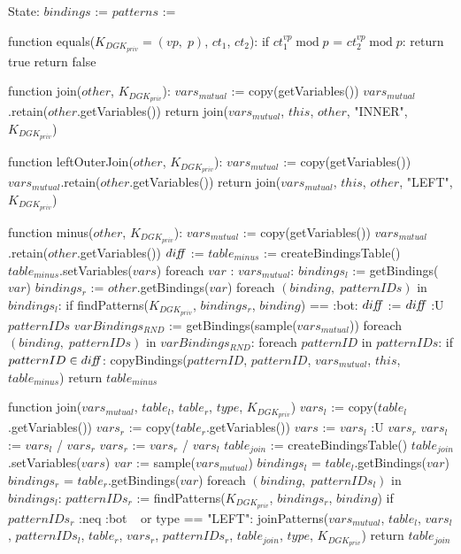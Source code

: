 State:
    $bindings$ := {}
    $patterns$ := {}

function equals($K_{DGK_{priv}} = (vp, \; p)$, $ct_1$, $ct_2$):
    if $ct_1^{vp} \; \textrm{mod} \; p$ = $ct_2^{vp} \; \textrm{mod} \; p$:
        return true
    return false

function join($other$, $K_{DGK_{priv}}$):
    $vars_{mutual}$ := copy(getVariables())
    $vars_{mutual}$.retain($other$.getVariables())
    return join($vars_{mutual}$, $this$, $other$, "INNER", $K_{DGK_{priv}}$)

function leftOuterJoin($other$, $K_{DGK_{priv}}$): 
    $vars_{mutual}$ := copy(getVariables())
    $vars_{mutual}$.retain($other$.getVariables())
    return join($vars_{mutual}$, $this$, $other$, "LEFT", $K_{DGK_{priv}}$)

function minus($other$, $K_{DGK_{priv}}$):
    $vars_{mutual}$ := copy(getVariables())
    $vars_{mutual}$.retain($other$.getVariables())
    $di\textrm{\emph{ff}}$ := {}
    $table_{minus}$ := createBindingsTable()
    $table_{minus}$.setVariables($vars$)
    foreach $var$ : $vars_{mutual}$:
        $bindings_l$ := getBindings($var$)
        $bindings_r$ := $other$.getBindings($var$)
        foreach $(binding, \; patternIDs)$ in $bindings_l$:
            if findPatterns($K_{DGK_{priv}}$, $bindings_r$, $binding$) == :bot:
                $di\textrm{\emph{ff}}$ := $di\textrm{\emph{ff}}$ :U $patternIDs$
    $varBindings_{RND}$ := getBindings(sample($vars_{mutual}$))
    foreach $(binding, \; patternIDs)$ in $varBindings_{RND}$:
        foreach $patternID$ in $patternIDs$:
            if $patternID \in di\textrm{\emph{ff}}$:
                copyBindings($patternID$, $patternID$, $vars_{mutual}$, $this$, $table_{minus}$)
    return $table_{minus}$

function join($vars_{mutual}$, $table_l$, $table_r$, $type$, $K_{DGK_{priv}}$) 
    $vars_l$ := copy($table_l$.getVariables())
    $vars_r$ := copy($table_r$.getVariables())
    $vars$ := $vars_l$ :U $vars_r$
    $vars_l$ := $vars_l$ / $vars_r$
    $vars_r$ := $vars_r$ / $vars_l$
    $table_{join}$ := createBindingsTable()
    $table_{join}$.setVariables($vars$)
    $var$ := sample($vars_{mutual}$) 
    $bindings_l$ = $table_l$.getBindings($var$)
    $bindings_r$ = $table_r$.getBindings($var$)
    foreach $(binding, \; patternIDs_l)$ in $bindings_l$: 
        $patternIDs_r$ := findPatterns($K_{DGK_{priv}}$, $bindings_r$, $binding$)
        if $patternIDs_r$ :neq :bot $\:\:$ or type == "LEFT":
            joinPatterns($vars_{mutual}$, $table_l$, $vars_l$, $patternIDs_l$, $table_r$, $vars_r$, $patternIDs_r$, $table_{join}$, $type$, $K_{DGK_{priv}}$)
    return $table_{join}$

